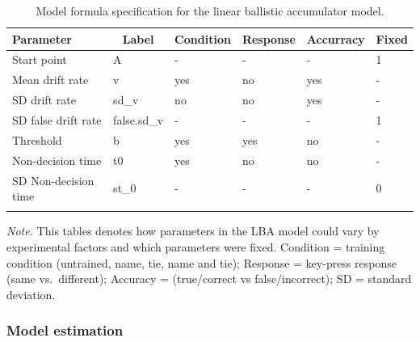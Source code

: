 \documentclass[
  english,
  man, donotrepeattitle,floatsintext]{apa6}
\begin{document}
\begin{table}[H]

\begin{center}
\begin{threeparttable}

\caption{\label{tab:lba-formula-table}Model formula specification for the linear ballistic accumulator model.}

\begin{tabular}{llllll}
\toprule
Parameter & \multicolumn{1}{c}{Label} & \multicolumn{1}{c}{Condition} & \multicolumn{1}{c}{Response} & \multicolumn{1}{c}{Accurracy} & \multicolumn{1}{c}{Fixed}\\
\midrule
Start point & A & - & - & - & 1\\
Mean drift rate & v & yes & no & yes & -\\
SD drift rate & sd\_v & no & no & yes & -\\
SD false drift rate & false.sd\_v & - & - & - & 1\\
Threshold & b & yes & yes & no & -\\
Non-decision time & t0 & yes & no & no & -\\
SD Non-decision time & st\_0 & - & - & - & 0\\
\bottomrule
\addlinespace
\end{tabular}

\begin{tablenotes}[para]
\normalsize{\textit{Note.} This tables denotes how parameters in the LBA model could vary by experimental factors and which parameters were fixed. Condition = training condition (untrained, name, tie, name and tie); Response = key-press response (same vs.~different); Accuracy = (true/correct vs false/incorrect); SD = standard deviation.}
\end{tablenotes}

\end{threeparttable}
\end{center}

\end{table}

\subsubsection{Model estimation}\label{model-estimation}
\end{document}
